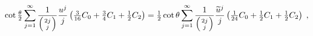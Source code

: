 \begin{equation}
\cot \tfrac{\theta}{2}
\sum_{j=1}^{\infty} \frac{1}{\left(2j\atop j\right)}\frac{u^j}{j}
\left(
\tfrac{3}{16}C_0+\tfrac{3}{4}C_1+\tfrac{1}{2}C_2
\right)
=\tfrac{1}{2} 
\cot \theta
\sum_{j=1}^{\infty} \frac{1}{\left(2j\atop j\right)}
\frac{{\widetilde{u}}^j}{j} 
\left(
\tfrac{1}{24}C_0 + \tfrac{1}{2}C_1 + \tfrac{1}{2}C_2
\right) \; , 
\end{equation}

